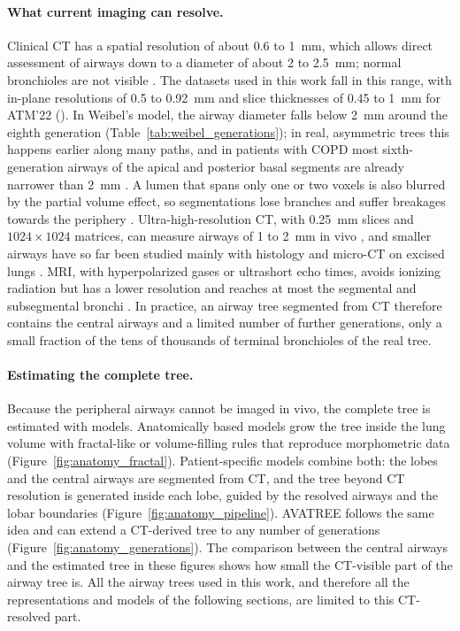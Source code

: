 \paragraph{What current imaging can resolve.}  %
Clinical CT has a spatial resolution of about 0.6 to 1~mm, which allows direct assessment of
airways down to a diameter of about 2 to 2.5~mm; normal bronchioles are not visible
\cite{burgel2013small}. The datasets used in this work fall in this range, with in-plane
resolutions of 0.5 to 0.92~mm and slice thicknesses of 0.45 to 1~mm for ATM'22
(). In Weibel's model, the airway diameter falls below 2~mm around the eighth
generation (Table~\ref{tab:weibel_generations}); in real, asymmetric trees this happens
earlier along many paths, and in patients with COPD most sixth-generation airways of the
apical and posterior basal segments are already narrower than 2~mm \cite{tanabe2019peripheral}.
A lumen that spans only one or two voxels is also blurred by the partial volume effect, so
segmentations lose branches and suffer breakages towards the periphery \cite{zhang2024}.
Ultra-high-resolution CT, with 0.25~mm slices and $1024 \times 1024$ matrices, can measure
airways of 1 to 2~mm in vivo \cite{tanabe2018uhrct,tanabe2019peripheral}, and smaller airways
have so far been studied mainly with histology and micro-CT on excised lungs
\cite{tanabe2018uhrct}. MRI, with hyperpolarized gases or ultrashort echo times, avoids
ionizing radiation but has a lower resolution and reaches at most the segmental and
subsegmental bronchi \cite{lewis2005,genkin2024}. In practice, an airway tree segmented from CT
therefore contains the central airways and a limited number of further generations, only a
small fraction of the tens of thousands of terminal bronchioles of the real tree.

\paragraph{Estimating the complete tree.}  %
Because the peripheral airways cannot be imaged in vivo, the complete tree is estimated with
models. Anatomically based models grow the tree inside the lung volume with fractal-like or
volume-filling rules that reproduce morphometric data \cite{kitaoka1999,tawhai2000}
(Figure~\ref{fig:anatomy_fractal}). Patient-specific models combine both: the lobes and the
central airways are segmented from CT, and the tree beyond CT resolution is generated inside
each lobe, guided by the resolved airways and the lobar boundaries
\cite{tawhai2004,bordas2015,pennati2024modeling} (Figure~\ref{fig:anatomy_pipeline}). AVATREE
follows the same idea and can extend a CT-derived tree to any number of generations
\cite{nousias2020avatree} (Figure~\ref{fig:anatomy_generations}). The comparison between the
central airways and the estimated tree in these figures shows how small the CT-visible part of
the airway tree is. All the airway trees used in this work, and therefore all the
representations and models of the following sections, are limited to this CT-resolved part.

